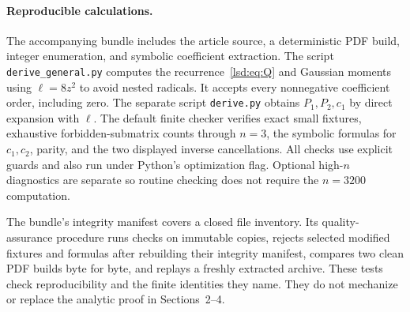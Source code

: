 \documentclass[11pt]{article}
\theoremstyle{remark}\newtheorem{remark}{Remark}
\begin{document}
\paragraph{Reproducible calculations.}
The accompanying bundle includes the article source, a deterministic PDF build, integer enumeration, and symbolic coefficient extraction. The script \texttt{derive\_general.py} computes the recurrence~\eqref{lsd:eq:Q} and Gaussian moments using $\ell=8z^2$ to avoid nested radicals. It accepts every nonnegative coefficient order, including zero. The separate script \texttt{derive.py} obtains $P_1,P_2,c_1$ by direct expansion with $\ell$. The default finite checker verifies exact small fixtures, exhaustive forbidden-submatrix counts through $n=3$, the symbolic formulas for $c_1,c_2$, parity, and the two displayed inverse cancellations. All checks use explicit guards and also run under Python's optimization flag. Optional high-$n$ diagnostics are separate so routine checking does not require the $n=3200$ computation.

The bundle's integrity manifest covers a closed file inventory. Its quality-assurance procedure runs checks on immutable copies, rejects selected modified fixtures and formulas after rebuilding their integrity manifest, compares two clean PDF builds byte for byte, and replays a freshly extracted archive. These tests check reproducibility and the finite identities they name. They do not mechanize or replace the analytic proof in Sections~2--4.
\end{document}
